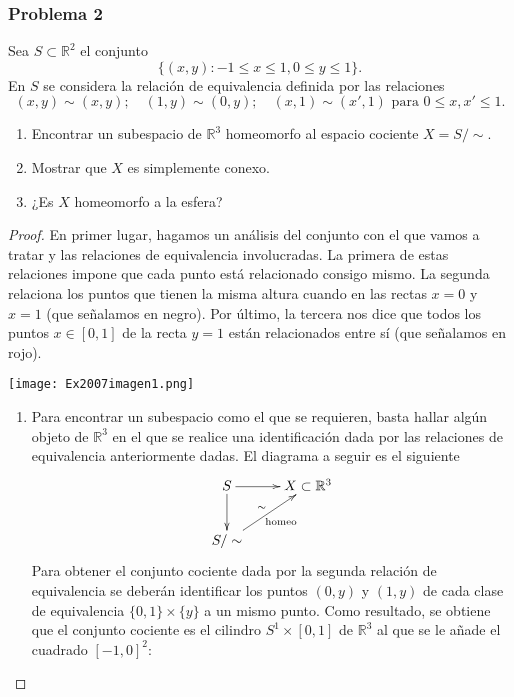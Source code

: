 \begin{itemize}
\subsubsection{Problema 2}
Sea $S\subset \mathbb{R}^2$ el conjunto
\begin{equation}
	\{(x,y): -1 \leq x\leq 1, 0\leq y \leq 1\}.
\end{equation}
En $S$ se considera la relación de equivalencia definida por las relaciones
\[(x,y)\sim (x,y); \quad (1,y)\sim (0,y); \quad (x,1)\sim (x',1) \text{ para } 0\leq x,x'\leq 1.\] 
\begin{enumerate}
	\item Encontrar un subespacio de $\mathbb{R}^3$ homeomorfo al espacio cociente $X=S/\sim$.
	\item Mostrar que $X$ es simplemente conexo.
	\item ¿Es $X$ homeomorfo a la esfera?
\end{enumerate}
\begin{proof}
	
	En primer lugar, hagamos un análisis del conjunto con el que vamos a tratar y las relaciones de equivalencia involucradas. La primera de estas relaciones impone que cada punto está relacionado consigo mismo. La segunda relaciona los puntos que tienen la misma altura cuando en las rectas $x=0$ y $x=1$ (que señalamos en negro). Por último, la tercera nos dice que todos los puntos $x\in[0,1]$ de la recta $y=1$ están relacionados entre sí (que señalamos en rojo).
		\begin{center}
			\texttt{[image: Ex2007imagen1.png]} 
		\end{center}
	
	\begin{enumerate}
		\item Para encontrar un subespacio como el que se requieren, basta hallar algún objeto de $\mathbb{R}^3$ en el que se realice una identificación dada por las relaciones de equivalencia anteriormente dadas. El diagrama a seguir es el siguiente
	\[\xymatrix{
S \ar[r] \ar[d]  & X\subset \mathbb{R}^3  \\
S/\sim \ar[ru]^{\sim}_{\mathrm{homeo}}}\]
	Para obtener el conjunto cociente dada por la segunda relación de equivalencia se deberán identificar los puntos $(0,y)$ y $(1,y)$ de cada clase de equivalencia $\{0,1\}\times \{y\}$ a un mismo punto. Como resultado, se obtiene que el conjunto cociente es el cilindro $S^1\times [0,1]$ de $\mathbb{R}^3$ al que se le añade el cuadrado $[-1,0]^2$:
 

\end{enumerate}
\end{proof}
\end{itemize}
